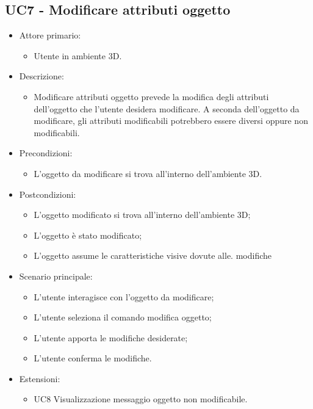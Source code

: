 \subsection{UC7 - Modificare attributi oggetto}
\begin{itemize}

	\item Attore primario: 
	\begin{itemize}
		\item Utente in ambiente 3D.
	\end{itemize}
	\item Descrizione:
	\begin{itemize}
		\item Modificare attributi oggetto prevede la modifica degli attributi dell'oggetto che l'utente desidera modificare.
\newline A seconda dell'oggetto da modificare, gli attributi modificabili potrebbero essere diversi oppure non modificabili.
	\end{itemize}
	
	\item Precondizioni:
	\begin{itemize}
		\item L'oggetto da modificare si trova all'interno dell'ambiente 3D.
	\end{itemize}
	
	\item Postcondizioni:
	\begin{itemize}
		\item L'oggetto modificato si trova all'interno dell'ambiente 3D;
		\item L'oggetto è stato modificato;
		\item L'oggetto assume le caratteristiche visive dovute alle. modifiche
	\end{itemize}
	
	\item Scenario principale:
	\begin{itemize}
		\item L'utente interagisce con l'oggetto da modificare;
		\item L'utente seleziona il comando modifica oggetto;
		\item L'utente apporta le modifiche desiderate;
		\item L'utente conferma le modifiche.
	\end{itemize}
	
	\item Estensioni:
	\begin{itemize}
		\item UC8 Visualizzazione messaggio oggetto non modificabile.
	\end{itemize}
	
\end{itemize}

